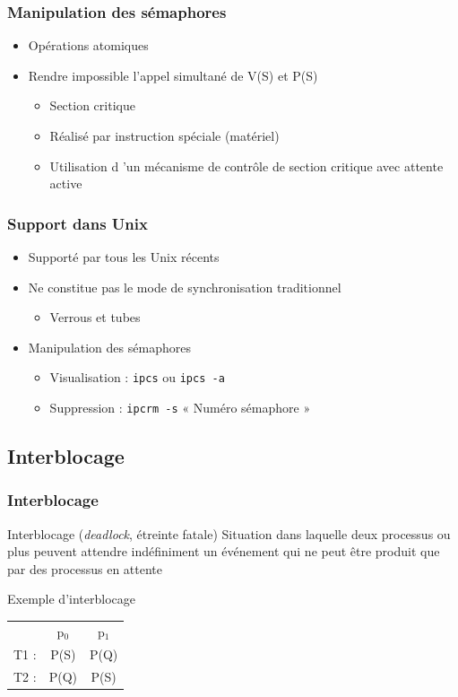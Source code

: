 \begin{frame}
\frametitle{Manipulation des sémaphores}
\begin{itemize}
\item Opérations atomiques
\item Rendre impossible l’appel simultané de V(S) et P(S)
\begin{itemize}
\item Section critique
\item Réalisé par instruction spéciale (matériel)
\item Utilisation d ’un mécanisme de contrôle de section critique avec attente active
\end{itemize}
\end{itemize}
\end{frame}

\begin{frame}
\frametitle{Support dans Unix}
\begin{itemize}
\item Supporté par tous les Unix récents
\item Ne constitue pas le mode de synchronisation traditionnel
\begin{itemize}
\item Verrous et tubes
\end{itemize}
\item Manipulation des sémaphores
\begin{itemize}
\item Visualisation : \texttt{ipcs} ou \texttt{ipcs -a}
\item Suppression : \texttt{ipcrm -s} « Numéro sémaphore »
\end{itemize}
\end{itemize}
\end{frame}

\subsection{Interblocage}

\begin{frame}
\frametitle{Interblocage}
\begin{block}{Interblocage (\textit{deadlock}, étreinte fatale)}
Situation dans laquelle deux processus ou plus peuvent attendre indéfiniment un événement qui ne peut être produit que par des processus en attente
\end{block}
\begin{exampleblock}{Exemple d'interblocage}
\begin{tabular}{ccc}
 & p$_0$ & p$_1$ \\
T1 : & P(S) & P(Q) \\
T2 : & P(Q) & P(S) \\
\end{tabular}
\end{exampleblock}
\end{frame}

